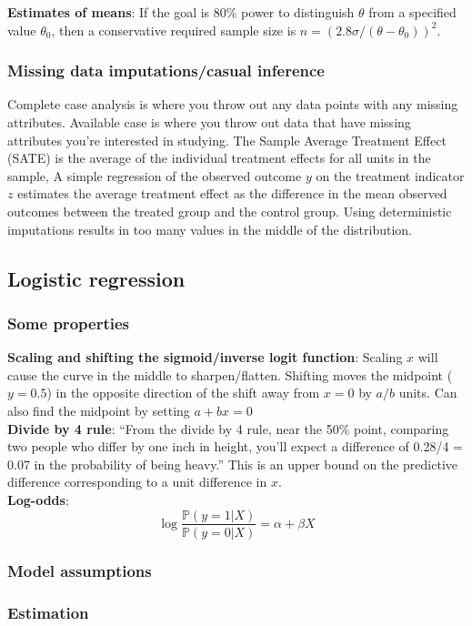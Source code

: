 \documentclass{article}
\begin{document}
\textbf{Estimates of means}: If the goal is 80\% power to distinguish $\theta$ from a
specified value $\theta_0$, then a conservative required sample size is $n = (2.8 \sigma/(\theta - \theta_0))^2$.

\subsubsection{Missing data imputations/casual inference}
Complete case analysis is where you throw out any data points with any missing attributes. Available case is where you throw out data that have missing attributes you're interested in studying.
The Sample Average Treatment Effect (SATE) is the average of the individual treatment effects for all units in the sample,
A simple regression of the observed outcome $y$ on the treatment indicator $z$ estimates the average treatment effect as the difference in the mean observed outcomes between the treated group and the control group.
Using deterministic imputations results in too many values in the middle of the distribution.
\subsection{Logistic regression}
\subsubsection{Some properties}
\textbf{Scaling and shifting the sigmoid/inverse logit function}: Scaling $x$ will cause the curve in the middle to sharpen/flatten. Shifting moves the midpoint ($y=0.5$) in the opposite direction of the shift away from $x=0$ by $a/b$ units.
Can also find the midpoint by setting $a + bx = 0$\\

\textbf{Divide by 4 rule}: ``From the divide by 4 rule, near the 50\% point, comparing two people who differ by one inch in height, you’ll expect a difference of 0.28/4 = 0.07 in the probability of being heavy.'' This is an upper bound on the predictive difference corresponding to a unit difference in $x$.\\

\textbf{Log-odds}: \[ \log \frac{\mathbb{P}(y = 1 | X)}{\mathbb{P}(y = 0 | X)} = \alpha + \beta X \]
\subsubsection{Model assumptions}
\subsubsection{Estimation}
\end{document}
